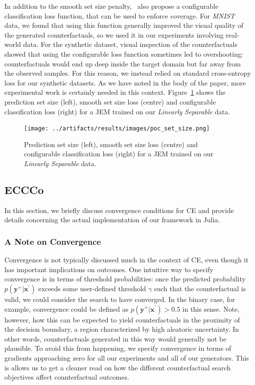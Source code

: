 \documentclass{article}
\begin{document}
In addition to the smooth set size penalty,~\citet{stutz2022learning} also propose a configurable classification loss function, that can be used to enforce coverage. For \textit{MNIST} data, we found that using this function generally improved the visual quality of the generated counterfactuals, so we used it in our experiments involving real-world data. For the synthetic dataset, visual inspection of the counterfactuals showed that using the configurable loss function sometimes led to overshooting: counterfactuals would end up deep inside the target domain but far away from the observed samples. For this reason, we instead relied on standard cross-entropy loss for our synthetic datasets. As we have noted in the body of the paper, more experimental work is certainly needed in this context. Figure~\ref{fig:cp-diff} shows the prediction set size (left), smooth set size loss (centre) and configurable classification loss (right) for a JEM trained on our \textit{Linearly Separable} data.

\begin{figure}
  \centering
  \texttt{[image: ../artifacts/results/images/poc\_set\_size.png]}
  \caption{Prediction set size (left), smooth set size loss (centre) and configurable classification loss (right) for a JEM trained on our \textit{Linearly Separable} data.}\label{fig:cp-diff}
\end{figure}

\subsection{ECCCo}\label{app:eccco}

In this section, we briefly discuss convergence conditions for CE and provide details concerning the actual implementation of our framework in Julia.  
\subsubsection{A Note on Convergence}

Convergence is not typically discussed much in the context of CE, even though it has important implications on outcomes. One intuitive way to specify convergence is in terms of threshold probabilities: once the predicted probability $p(\mathbf{y}^+|\mathbf{x}^{\prime})$ exceeds some user-defined threshold $\gamma$ such that the counterfactual is valid, we could consider the search to have converged. In the binary case, for example, convergence could be defined as $p(\mathbf{y}^+|\mathbf{x}^{\prime})>0.5$ in this sense. Note, however, how this can be expected to yield counterfactuals in the proximity of the decision boundary, a region characterized by high aleatoric uncertainty. In other words, counterfactuals generated in this way would generally not be plausible. To avoid this from happening, we specify convergence in terms of gradients approaching zero for all our experiments and all of our generators. This is allows us to get a cleaner read on how the different counterfactual search objectives affect counterfactual outcomes. 
\end{document}
